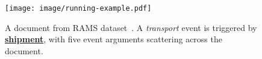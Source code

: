 \begin{figure}
    \centering
    \texttt{[image: image/running-example.pdf]}
    \caption{
    A document from RAMS dataset~\cite{rams}.
    A \emph{transport} event is triggered by \textbf{\underline{shipment}}, with five event arguments scattering across the document.
    }
\label{fig:running-example}
\end{figure}